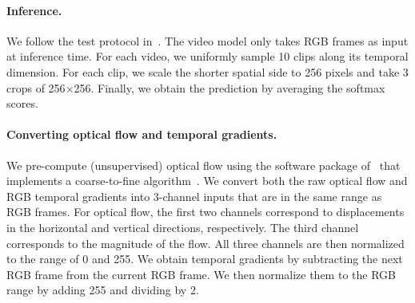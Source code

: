 \documentclass[10pt,twocolumn,letterpaper]{article}
\begin{document}
\paragraph{Inference.} 
We follow the test protocol in~\cite{feichtenhofer2019slowfast}. The video model only takes RGB frames as input at inference {time}.  
For each video, we uniformly sample 10 clips along its temporal dimension. For each
clip, we scale the shorter spatial side to 256 pixels and take
3 crops of 256$\times$256. Finally, we obtain the prediction by averaging the softmax scores.

\paragraph{Converting optical flow and temporal gradients.} 
We pre-compute (unsupervised) optical flow using the software package of~\cite{liu2009beyond} that implements {a coarse-to-fine algorithm}~\cite{bruhn2005lucas}. We convert both the raw optical flow and RGB temporal gradients into 3-channel inputs that are in the same range as RGB frames. For optical flow, the 
{first two} channels correspond to displacements in the horizontal and vertical directions, respectively. The
{third} channel corresponds to the magnitude of the flow. All three channels are then normalized to the range of 0 and 255. 
We obtain temporal gradients by subtracting the next RGB frame from the current RGB frame. We then normalize them to the RGB range by adding 255 and dividing by 2.
\end{document}
